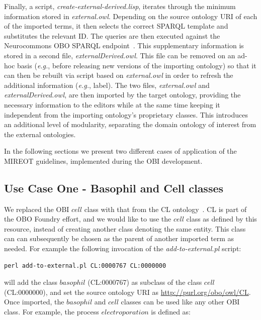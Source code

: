\documentclass[jou]{ao2e}%
\begin{document}
Finally, a script, \emph{create-external-derived.lisp}, iterates through the minimum information stored in \emph{external.owl}.
Depending on the source ontology URI of each of the imported terms, it then selects the correct SPARQL template and substitutes the relevant ID.
The queries are then executed against the Neurocommons OBO SPARQL endpoint~\citep{NeurocommonsSparql,Neurocommons}. This supplementary information is stored in a second file, \emph{externalDerived.owl}.
This file can be removed on an ad-hoc basis (\emph{e.g.}, before releasing new versions of the importing ontology) so that it can then be rebuilt via script based on \emph{external.owl} in order to refresh the additional information (\emph{e.g.}, label). The two files, \emph{external.owl} and \emph{externalDerived.owl}, are then imported by the target ontology, providing the necessary information to the editors while at the same time keeping it independent from the importing ontology's proprietary classes. This introduces an additional level of modularity, separating the domain ontology of interest from the external ontologies.

In the following sections we present two different cases of application of the \ac{MIREOT} guidelines, implemented during the \ac{OBI} development.





\subsection{Use Case One - Basophil and Cell classes}

We replaced the \ac{OBI} $cell$ class with that from the \ac{CL} ontology~\citep{CL}. 
\ac{CL} is part of the \ac{OBO} Foundry effort, and we would like to use the $cell$ class as defined by this resource, instead of creating another class denoting the same entity.
This class can can subsequently be chosen as the parent of another imported term as needed.
For example the following invocation of the \emph{add-to-external.pl} script:

\begin{footnotesize}
\begin{verbatim}
perl add-to-external.pl CL:0000767 CL:0000000 
\end{verbatim}
\end{footnotesize}

will add the class $basophil$ (CL:0000767) as subclass of the class $cell$  (CL:0000000), and set the source ontology URI as \url{http://purl.org/obo/owl/CL}.
Once imported, the $basophil$ and $cell$ classes can be used like any other OBI class. For example, the process $electroporation$ is defined as:
\end{document}
